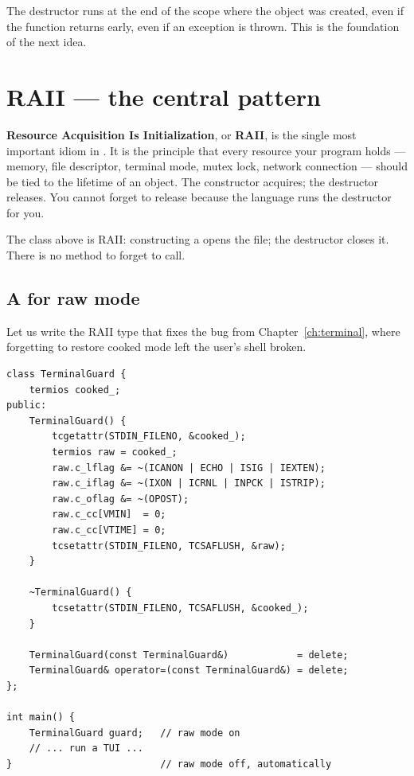 The destructor runs at the end of the scope where the object was
created, even if the function returns early, even if an exception is
thrown. This is the foundation of the next idea.

\section{RAII --- the central pattern}
\label{sec:cpp:raii}

\textbf{Resource Acquisition Is Initialization}, or \textbf{RAII}, is
the single most important idiom in \cpp{}. It is the principle that
every resource your program holds --- memory, file descriptor,
terminal mode, mutex lock, network connection --- should be tied to
the lifetime of an object. The constructor acquires; the destructor
releases. You cannot forget to release because the language runs the
destructor for you.

The  class above is RAII: constructing a  opens
the file; the destructor closes it. There is no 
method to forget to call.

\subsection{A  for raw mode}

Let us write the RAII type that fixes the bug from
Chapter~\ref{ch:terminal}, where forgetting to restore cooked mode
left the user's shell broken.

\begin{lstlisting}
class TerminalGuard {
    termios cooked_;
public:
    TerminalGuard() {
        tcgetattr(STDIN_FILENO, &cooked_);
        termios raw = cooked_;
        raw.c_lflag &= ~(ICANON | ECHO | ISIG | IEXTEN);
        raw.c_iflag &= ~(IXON | ICRNL | INPCK | ISTRIP);
        raw.c_oflag &= ~(OPOST);
        raw.c_cc[VMIN]  = 0;
        raw.c_cc[VTIME] = 0;
        tcsetattr(STDIN_FILENO, TCSAFLUSH, &raw);
    }

    ~TerminalGuard() {
        tcsetattr(STDIN_FILENO, TCSAFLUSH, &cooked_);
    }

    TerminalGuard(const TerminalGuard&)            = delete;
    TerminalGuard& operator=(const TerminalGuard&) = delete;
};

int main() {
    TerminalGuard guard;   // raw mode on
    // ... run a TUI ...
}                          // raw mode off, automatically
\end{lstlisting}

